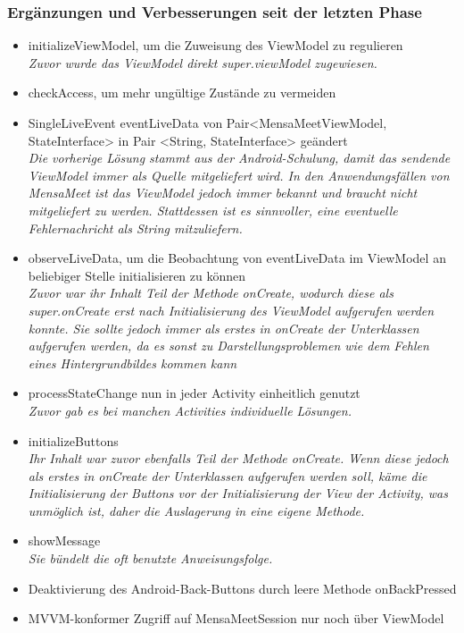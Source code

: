 \documentclass[a4paper]{scrreprt}
\begin{document}
\subsubsection{Ergänzungen und Verbesserungen seit der letzten Phase}
\begin{itemize}
\item initializeViewModel, um die Zuweisung des ViewModel zu regulieren\\
\textit{Zuvor wurde das ViewModel direkt super.viewModel zugewiesen.}
\item checkAccess, um mehr ungültige Zustände zu vermeiden
\item SingleLiveEvent eventLiveData von Pair<MensaMeetViewModel, StateInterface> in Pair <String, StateInterface> geändert\\
\textit{Die vorherige Lösung stammt aus der Android-Schulung, damit das sendende ViewModel immer als Quelle mitgeliefert wird. In den Anwendungsfällen von MensaMeet ist das ViewModel jedoch immer bekannt und braucht nicht mitgeliefert zu werden. Stattdessen ist es sinnvoller, eine eventuelle Fehlernachricht als String mitzuliefern.}
\item observeLiveData, um die Beobachtung von eventLiveData im ViewModel an beliebiger Stelle initialisieren zu können\\
\textit{Zuvor war ihr Inhalt Teil der Methode onCreate, wodurch diese als super.onCreate erst nach Initialisierung des ViewModel aufgerufen werden konnte. Sie sollte jedoch immer als erstes in onCreate der Unterklassen aufgerufen werden, da es sonst zu Darstellungsproblemen wie dem Fehlen eines Hintergrundbildes kommen kann}
\item processStateChange nun in jeder Activity einheitlich genutzt\\
\textit{Zuvor gab es bei manchen Activities individuelle Lösungen.}
\item initializeButtons\\
\textit{Ihr Inhalt war zuvor ebenfalls Teil der Methode onCreate. Wenn diese jedoch als erstes in onCreate der Unterklassen aufgerufen werden soll, käme die Initialisierung der Buttons vor der Initialisierung der View der Activity, was unmöglich ist, daher die Auslagerung in eine eigene Methode.}
\item showMessage\\
\textit{Sie bündelt die oft benutzte Anweisungsfolge.}
\item Deaktivierung des Android-Back-Buttons durch leere Methode onBackPressed
\item MVVM-konformer Zugriff auf MensaMeetSession nur noch über ViewModel

\end{itemize}
\end{document}
